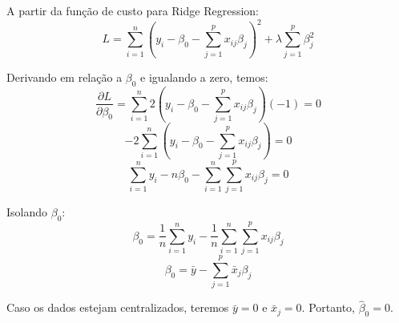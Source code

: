 A partir da função de custo para Ridge Regression:
$$ L = \sum_{i=1}^n \left( y_i - \beta_0 - \sum_{j=1}^p x_{ij}\beta_j \right)^2 + \lambda \sum_{j=1}^p \beta_j^2 $$

Derivando em relação a $ \beta_0 $ e igualando a zero, temos:
$$ \frac{\partial L}{\partial \beta_0} = \sum_{i=1}^n 2 \left( y_i - \beta_0 - \sum_{j=1}^p x_{ij}\beta_j \right) (-1) = 0 $$
$$ -2 \sum_{i=1}^n \left( y_i - \beta_0 - \sum_{j=1}^p x_{ij}\beta_j \right) = 0 $$
$$ \sum_{i=1}^n y_i - n\beta_0 - \sum_{i=1}^n \sum_{j=1}^p x_{ij}\beta_j = 0 $$

Isolando $ \beta_0 $:
$$ \beta_0 = \frac{1}{n}\sum_{i=1}^n y_i - \frac{1}{n}\sum_{i=1}^n \sum_{j=1}^p x_{ij}\beta_j $$
$$ \beta_0 = \bar{y} - \sum_{j=1}^p \bar{x}_j \beta_j $$

Caso os dados estejam centralizados, teremos $ \bar{y} = 0 $ e $ \bar{x}_j = 0 $. Portanto, $ \hat{\beta}_0 = 0 $.

